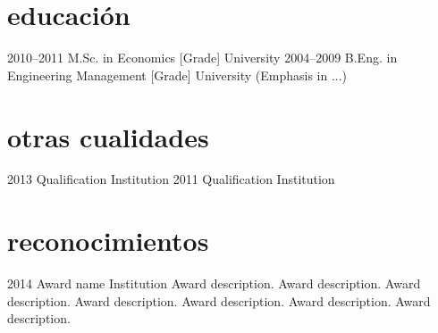 \documentclass[]{cv-style}          %
\begin{document}
\section{educación}

\begin{entrylist}
\entry
{2010--2011}
{M.Sc. {\normalfont in Economics [Grade]}}
{University}
{\vspace{-0.3cm}}
\entry
{2004--2009}
{B.Eng. {\normalfont in Engineering Management [Grade]}}
{University}
{(Emphasis in ...)}
\end{entrylist}


\section{otras cualidades}

\begin{entrylist}
\entry
{2013}
{Qualification}
{Institution}
{\vspace{-0.3cm}}
\entry
{2011}
{Qualification}
{Institution}
{\vspace{-0.3cm}}
\end{entrylist}


\section{reconocimientos}

\begin{entrylist}
\entry
{2014}
{Award name}
{Institution}
{Award description. Award description. Award description. Award description. Award description. Award description. Award description. }
\end{entrylist}
\end{document}
